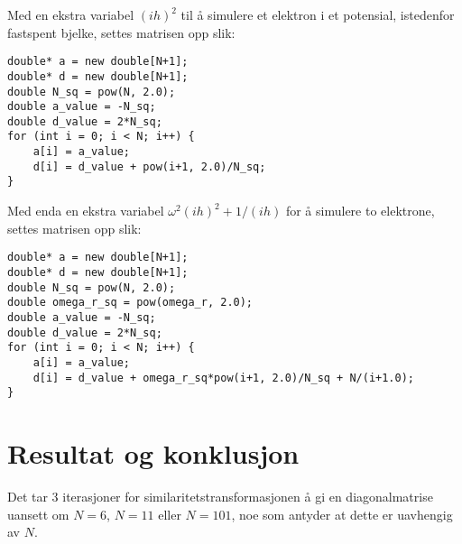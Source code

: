 \documentclass[a4paper,10pt,english]{article}
\begin{document}
Med en ekstra variabel $(ih)^2$ til å simulere et elektron i et potensial,
istedenfor fastspent bjelke, settes matrisen opp slik:
\begin{lstlisting}
double* a = new double[N+1];
double* d = new double[N+1];
double N_sq = pow(N, 2.0);
double a_value = -N_sq;
double d_value = 2*N_sq;
for (int i = 0; i < N; i++) {
    a[i] = a_value;
    d[i] = d_value + pow(i+1, 2.0)/N_sq;
}
\end{lstlisting}

Med enda en ekstra variabel $\omega^2 (i h)^2 + 1/(i h)$ for å simulere to
elektrone, settes matrisen opp slik:
\begin{lstlisting}
double* a = new double[N+1];
double* d = new double[N+1];
double N_sq = pow(N, 2.0);
double omega_r_sq = pow(omega_r, 2.0);
double a_value = -N_sq;
double d_value = 2*N_sq;
for (int i = 0; i < N; i++) {
    a[i] = a_value;
    d[i] = d_value + omega_r_sq*pow(i+1, 2.0)/N_sq + N/(i+1.0);
}
\end{lstlisting}

\section*{Resultat og konklusjon}
Det tar 3 iterasjoner for similaritetstransformasjonen å gi en diagonalmatrise uansett om $N=6$, $N=11$ eller $N=101$, noe som antyder at dette er uavhengig av $N$.

\printbibliography
\end{document}
